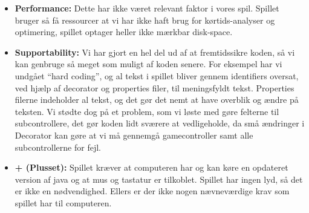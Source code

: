 \begin{itemize}
  \item \textbf{Performance:} Dette har ikke været relevant faktor i vores spil.
  Spillet bruger så få ressourcer at vi har ikke haft brug for kørtids-analyser
  og optimering, spillet optager heller ikke mærkbar disk-space.
  \item \textbf{Supportability:} Vi har gjort en hel del ud af at fremtidssikre
  koden, så vi kan genbruge så meget som muligt af koden senere. For eksempel
  har vi undgået “hard coding”, og al tekst i spillet bliver gennem identifiers
  oversat, ved hjælp af decorator og properties filer, til meningsfyldt tekst.
  Properties filerne indeholder al tekst, og det gør det nemt at have overblik
  og ændre på teksten. Vi stødte dog på et problem, som vi løste med gøre
  felterne til subcontrollere, det gør koden lidt sværere at vedligeholde, da
  små ændringer i Decorator kan gøre at vi må gennemgå gamecontroller samt alle
  subcontrollerne for fejl.
  \item \textbf{+ (Plusset):} Spillet kræver at computeren har og kan køre en
  opdateret version af java og at mus og tastatur er tilkoblet. Spillet har
  ingen lyd, så det er ikke en nødvendighed. Ellers er der ikke nogen
  nævneværdige krav som spillet har til computeren.
\end{itemize}